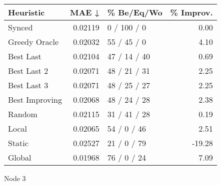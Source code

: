 \begin{tabular}{lrlr}
\toprule
\textbf{Heuristic} & \textbf{MAE ↓} & \textbf{\% Be/Eq/Wo} & \textbf{\% Improv.} \\
\midrule
            Synced &        0.02119 &          0 / 100 / 0 &                0.00 \\
     Greedy Oracle &        0.02032 &          55 / 45 / 0 &                4.10 \\
         Best Last &        0.02104 &         47 / 14 / 40 &                0.69 \\
       Best Last 2 &        0.02071 &         48 / 21 / 31 &                2.25 \\
       Best Last 3 &        0.02071 &         48 / 25 / 27 &                2.25 \\
    Best Improving &        0.02068 &         48 / 24 / 28 &                2.38 \\
            Random &        0.02115 &         31 / 41 / 28 &                0.19 \\
             Local &        0.02065 &          54 / 0 / 46 &                2.51 \\
            Static &        0.02527 &          21 / 0 / 79 &              -19.28 \\
            Global &        0.01968 &          76 / 0 / 24 &                7.09 \\
\bottomrule
\end{tabular}
\caption{Node 3}
\label{tab:iid_lr01_le1_bs2_3}
